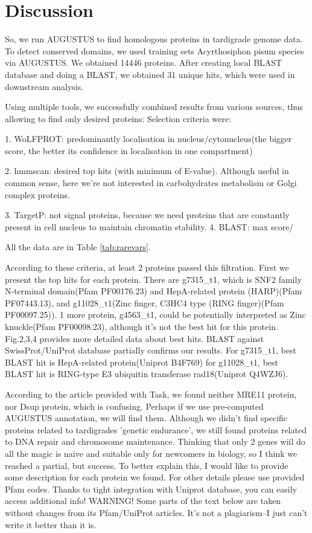 \documentclass{article}
\begin{document}
 
 
\section{Discussion}
 So, we run AUGUSTUS to find homologous proteins in tardigrade genome data. To detect conserved domains, we used training sets Acyrthosiphon pisum species via AUGUSTUS. We obtained 14446 proteins. After creating local BLAST database and doing a BLAST, we obtained 31 unique hits, which were used in downstream analysis.
 
 Using multiple tools, we successfully combined results from various sources, thus allowing to find only desired proteins: Selection criteria were:
 
 1. WoLFPROT: predominantly localisation in nucleus/cytonucleus(the bigger score, the better its confidence in localisation in one compartment)
 
 2. hmmscan: desired top hits (with minimum of E-value). Although useful in common sense, here we're not interested in carbohydrates metabolism or Golgi complex proteins.
 
 3. TargetP: not signal proteins, because we need proteins that are constantly present in cell nucleus to maintain chromatin stability.
 4. BLAST: max score/%
 
 All the data are in Table \ref{tab:rarevars}.
 
 According to these criteria, at least 2 proteins passed this filtration. First we present the top hits for each protein. There are g7315_t1, which is SNF2 family N-terminal domain(Pfam PF00176.23) and HepA-related protein (HARP)(Pfam PF07443.13), and g11028\_t1(Zinc finger, C3HC4 type (RING finger)(Pfam PF00097.25)). 1 more protein, g4563_t1, could be potentially interpreted as Zinc knuckle(Pfam PF00098.23), although it's not the best hit for this protein. Fig.2,3,4 provides more detailed data about best hits. BLAST against SwissProt/UniProt database partially confirms our results. For g7315_t1, best BLAST hit is HepA-related protein(Uniprot B4F769) for g11028_t1, best BLAST hit is RING-type E3 ubiquitin transferase rad18(Uniprot Q4WZJ6).
 
 According to the article provided with Task, we found neither MRE11 protein, nor Dsup protein, which is confusing. Perhaps if we use pre-computed AUGUSTUS annotation, we will find them. Although we didn't find specific proteins related to tardigrades 'genetic endurance', we still found proteins related to DNA repair and chromosome maintenance. Thinking that only 2 genes wiil do all the magic is naive and suitable only for newcomers in biology, so I think we reached a partial, but success. To better explain this, I would like to provide some description for each protein we found. For other details please use provided Pfam codes. Thanks to tight integration with Uniprot database, you can easily access additional info! WARNING! Some parts of the text below are taken without changes from its Pfam/UniProt articles. It's not a plagiarism--I just can't write it better than it is. 
 
\end{document}
